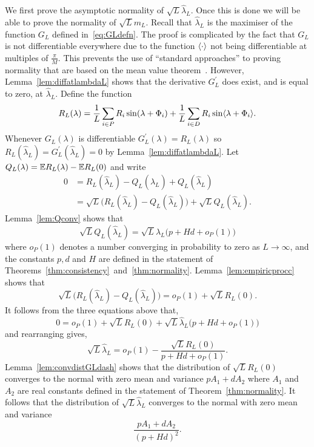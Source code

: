 \documentclass[journal]{IEEEtran}
\begin{document}
We first prove the asymptotic normality of $\sqrt{L} \hat{\lambda}_L$.  Once this is done we will be able to prove the normality of $\sqrt{L} m_L$.  Recall that $\hat{\lambda}_L$ is the maximiser of the function $G_L$ defined in~\eqref{eq:GLdefn}.  The proof is complicated by the fact that $G_L$ is not differentiable everywhere due to the function $\left\langle \cdot \right\rangle$ not being differentiable at multiples of $\tfrac{\pi}{M}$.  This prevents the use of ``standard approaches'' to proving normality that are based on the mean value theorem~\cite{vonMises_diff_stats_1947,vanDerVart1971_asymptotic_stats,Pollard_new_ways_clts_1986,Pollard_conv_stat_proc_1984,Pollard_asymp_empi_proc_1989}.  However, Lemma~\ref{lem:diffatlambdaL} shows that the derivative $G_L^\prime$ does exist, and is equal to zero, at $\hat{\lambda}_L$. Define the function
\begin{equation}\label{eq:RLdef}
R_L(\lambda) = \frac{1}{L} \sum_{i \in P} R_i \sin(\lambda + \Phi_i) + \frac{1}{L} \sum_{i \in D} R_i \sin\langle \lambda + \Phi_i \rangle.
\end{equation}
Whenever $G_L(\lambda)$ is differentiable $G_L^\prime(\lambda) = R_L(\lambda)$ so $R_L(\hat{\lambda}_L) = G_L^\prime(\hat{\lambda}_L) = 0$ by Lemma~\ref{lem:diffatlambdaL}.  Let $Q_L(\lambda) = {\mathbb E} R_L(\lambda) - {\mathbb E} R_L(0)$ and write
\begin{align*}
0 &= R_L(\hat{\lambda}_L) - Q_L(\hat{\lambda}_L) + Q_L(\hat{\lambda}_L) \\
&= \sqrt{L}\big( R_L(\hat{\lambda}_L) - Q_L(\hat{\lambda}_L) \big) + \sqrt{L}Q_L(\hat{\lambda}_L).
\end{align*}
Lemma~\ref{lem:Qconv} shows that
\[
\sqrt{L} Q_L(\hat{\lambda}_L) = \sqrt{L} \hat{\lambda}_L\big( p + Hd  + o_P(1) \big)
\]
where $o_P(1)$ denotes a number converging in probability to zero as $L \rightarrow \infty$, and the constants $p,d$ and $H$ are defined in the statement of Theorems~\ref{thm:consistency}~and~\ref{thm:normality}.  Lemma~\ref{lem:empiricprocc} shows that
\[
\sqrt{L}\big( R_L(\hat{\lambda}_L) - Q_L(\hat{\lambda}_L) \big) = o_P(1) + \sqrt{L} R_L(0).
\]
It follows from the three equations above that,
\[
0 = o_P(1) + \sqrt{L}R_L(0) + \sqrt{L} \hat{\lambda}_L \big( p + Hd  + o_P(1) \big)
\]
and rearranging gives,
\[
\sqrt{L} \hat{\lambda}_L = o_P(1) - \frac{\sqrt{L}R_L(0)}{p + Hd  + o_P(1)}.
\]
Lemma~\ref{lem:convdistGLdash} shows that the distribution of $\sqrt{L}R_L(0)$ converges to the normal with zero mean and variance $pA_1 + dA_2$ where $A_1$ and $A_2$ are real constants defined in the statement of Theorem~\ref{thm:normality}.  It follows that the distribution of $\sqrt{L}\hat{\lambda}_L$ converges to the normal with zero mean and variance
\[
\frac{pA_1 + dA_2}{(p + Hd)^2}.
\]
 
\end{document}
